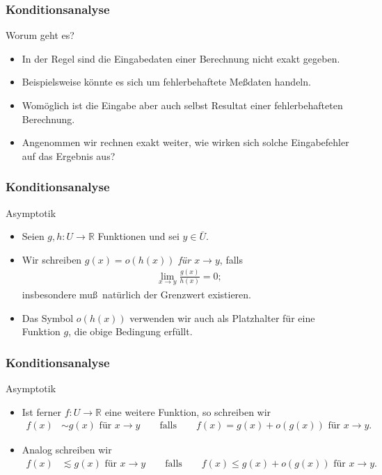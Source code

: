 \documentclass{beamer}
\title[Annuma]{\mytitle}
\author[Amin Coja-Oghlan]{Amin Coja-Oghlan}
\institute[Frankfurt]{JWGUFFM}
\date{}
\renewcommand{\emph}[1]{{\textcolor{solarizedRed}{\itshape #1}}}
\newcommand\RR{\mathbb R}
\renewcommand{\oe}{\"o}
\newcommand{\ue}{\"u}
\newcommand{\mytitle}{Konditionsanalyse}
\begin{document}
\frame[plain]{\titlepage}

\begin{frame}\frametitle{\mytitle}
	\begin{block}{Worum geht es?}
		\begin{itemize}
			\item In der Regel sind die Eingabedaten einer Berechnung nicht exakt gegeben.
			\item Beispielsweise k\oe nnte es sich um fehlerbehaftete Me\ss daten handeln.
			\item Wom\oe glich ist die Eingabe aber auch selbst Resultat einer fehlerbehafteten Berechnung.
			\item Angenommen wir rechnen \alert{exakt} weiter, wie wirken sich solche Eingabefehler auf das Ergebnis aus?
		\end{itemize}
	\end{block}
\end{frame}

\begin{frame}\frametitle{\mytitle}
	\begin{block}{Asymptotik}
		\begin{itemize}
			\item Seien $g,h:U\to\RR$ Funktionen und sei $y\in\bar U$.
			\item Wir schreiben \emph{$g(x)=o(h(x))$ f\"ur $x\to y$}, falls
				\begin{align*}
					\lim_{x\to y}\frac{g(x)}{h(x)}=0;
				\end{align*}
				insbesondere mu\ss\ nat\"urlich der Grenzwert existieren.
			\item Das Symbol $o(h(x))$ verwenden wir auch als Platzhalter f\"ur eine Funktion $g$, die obige Bedingung erf\ue llt.
		\end{itemize}
	\end{block}
\end{frame}

\begin{frame}\frametitle{\mytitle}
	\begin{block}{Asymptotik}
		\begin{itemize}
			\item Ist ferner $f:U\to\RR$ eine weitere Funktion, so schreiben wir
				\begin{align*}
					f(x)&\sim g(x)\mbox{ f\"ur }x\to y\qquad\mbox{falls}\qquad f(x)=g(x)+o(g(x))\mbox{ f\"ur }x\to y.
				\end{align*}
			\item Analog schreiben wir
				\begin{align*}
					f(x)&\lesssim g(x)\mbox{ f\"ur }x\to y\qquad\mbox{falls}\qquad f(x)\leq g(x)+o(g(x))\mbox{ f\"ur }x\to y.
				\end{align*}
		\end{itemize}
	\end{block}
\end{frame}
\end{document}
